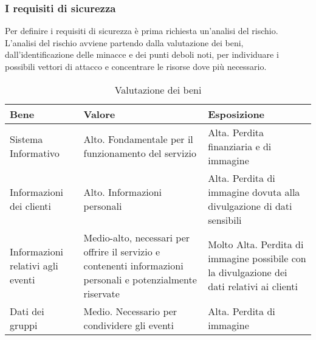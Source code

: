 \clearpage
\subsubsection{I requisiti di sicurezza}

Per definire i requisiti di sicurezza è prima richiesta un'analisi del rischio.
L'analisi del rischio avviene partendo dalla valutazione dei beni, dall'identificazione delle minacce e dei punti deboli noti,
per individuare i possibili vettori di attacco e concentrare le risorse dove più necessario.

\begin{table}[htb]

    \begin{tabular} {|P{3.5cm}|P{5.5cm}|P{6.7cm}|}
        \hline
        \textbf{Bene}                     & \textbf{Valore}                                                                                              & \textbf{Esposizione}      \\
        \hline
        Sistema Informativo               & Alto. Fondamentale per il funzionamento del servizio                                                         &
        Alta. Perdita finanziaria e di immagine                                                                                                                                      \\
        \hline
        Informazioni dei clienti          & Alto. Informazioni personali                                                                                 &
        Alta. Perdita di immagine dovuta alla divulgazione
        di dati sensibili                                                                                                                                                            \\
        \hline
        Informazioni relativi agli eventi & Medio-alto, necessari per offrire il servizio e contenenti informazioni personali e potenzialmente riservate &
        Molto Alta. Perdita di immagine possibile con la divulgazione dei dati relativi ai
        clienti                                                                                                                                                                      \\
        \hline
        Dati dei gruppi                   & Medio. Necessario per condividere gli eventi                                                                 & Alta. Perdita di immagine \\
        \hline
    \end{tabular}
    \caption{Valutazione dei beni}
\end{table}

